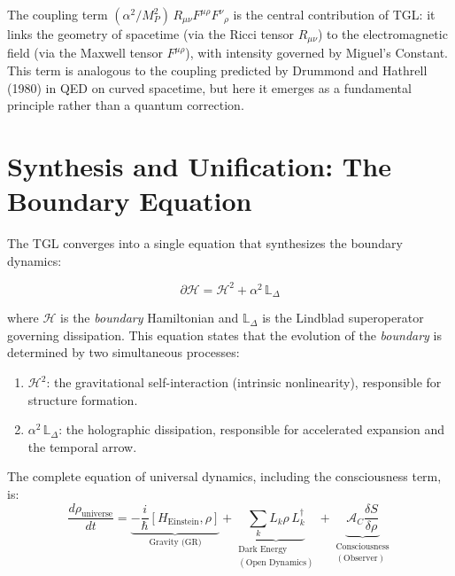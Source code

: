 \documentclass[12pt,a4paper,twoside]{article}
\newcommand{\alphaii}{\alpha^{2}}
\newcommand{\boundary}{\textit{boundary}}
\begin{document}
The coupling term $(\alphaii/M_P^2)\,R_{\mu\nu}F^{\mu\rho}F^\nu{}_\rho$ is the central contribution of TGL: it links the geometry of spacetime (via the Ricci tensor $R_{\mu\nu}$) to the electromagnetic field (via the Maxwell tensor $F^{\mu\rho}$), with intensity governed by Miguel's Constant. This term is analogous to the coupling predicted by Drummond and Hathrell (1980) in QED on curved spacetime, but here it emerges as a fundamental principle rather than a quantum correction.


\section{Synthesis and Unification: The Boundary Equation}


The TGL converges into a single equation that synthesizes the boundary dynamics:

\begin{equationbox}[title={TGL Master Equation}]
\begin{equation}
\boxed{\partial\mathcal{H} = \mathcal{H}^2 + \alphaii\,\mathbb{L}_\Delta}
\label{eq:mestra}
\end{equation}
\end{equationbox}

\noindent where $\mathcal{H}$ is the \boundary{} Hamiltonian and $\mathbb{L}_\Delta$ is the Lindblad superoperator governing dissipation. This equation states that the evolution of the \boundary{} is determined by two simultaneous processes:

\begin{enumerate}[nosep]
\item $\mathcal{H}^2$: the gravitational self-interaction (intrinsic nonlinearity), responsible for structure formation.
\item $\alphaii\,\mathbb{L}_\Delta$: the holographic dissipation, responsible for accelerated expansion and the temporal arrow.
\end{enumerate}

The complete equation of universal dynamics, including the consciousness term, is:
\begin{equation}
\frac{d\rho_{\text{universe}}}{dt} = \underbrace{-\frac{i}{\hbar}[H_{\text{Einstein}}, \rho]}_{\text{Gravity (GR)}} + \underbrace{\sum_k L_k\rho\, L_k^\dagger}_{\substack{\text{Dark Energy}\\(\text{Open Dynamics})}} + \underbrace{\mathcal{A}_C\frac{\delta S}{\delta\rho}}_{\substack{\text{Consciousness}\\(\text{Observer})}}
\label{eq:unificada}
\end{equation}
\end{document}

